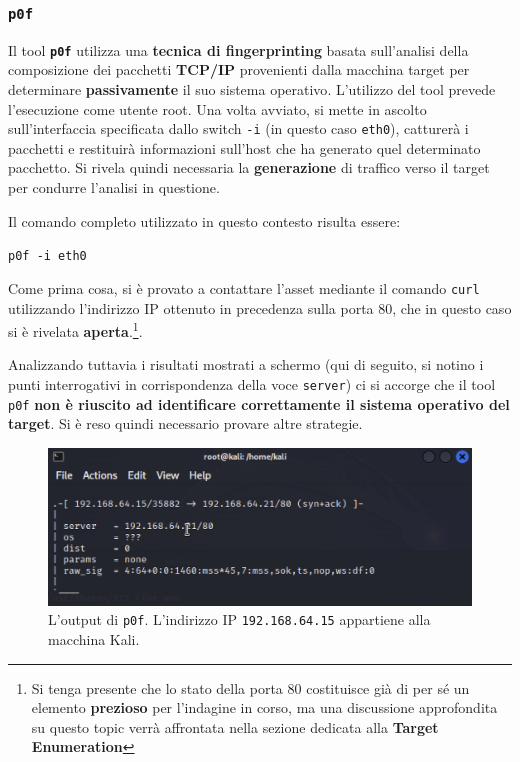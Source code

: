 \documentclass[a4paper, 12pt, oneside]{article}
\begin{document}
\subsubsection{\texttt{p0f}}
Il tool \textbf{\texttt{p0f}} utilizza una \textbf{tecnica di fingerprinting} basata sull'analisi della composizione dei pacchetti \textbf{TCP\slash IP} provenienti dalla macchina target per determinare \textbf{passivamente} il suo sistema operativo\cite{p0f}. L'utilizzo del tool prevede l'esecuzione come utente root. Una volta avviato, si mette in ascolto sull'interfaccia specificata dallo switch \texttt{-i} (in questo caso \texttt{eth0}), catturerà i pacchetti e restituirà informazioni sull'host che ha generato quel determinato pacchetto. Si rivela quindi necessaria la \textbf{generazione} di traffico verso il target per condurre l'analisi in questione. 

Il comando completo utilizzato in questo contesto risulta essere:

\begin{center}
    \texttt{p0f -i eth0}
\end{center}

Come prima cosa, si è provato a contattare l'asset mediante il comando \texttt{curl} utilizzando l'indirizzo IP ottenuto in precedenza sulla porta 80, che in questo caso si è rivelata \textbf{aperta}.\footnote{Si tenga presente che lo stato della porta 80 costituisce già di per sé un elemento \textbf{prezioso} per l'indagine in corso, ma una discussione approfondita su questo topic verrà affrontata nella sezione dedicata alla \textbf{Target Enumeration}}.


Analizzando tuttavia i risultati mostrati a schermo (qui di seguito, si notino i punti interrogativi in corrispondenza della voce \texttt{server}) ci si accorge che il tool \texttt{p0f} \textbf{non è riuscito ad identificare correttamente il sistema operativo del target}. Si è reso quindi necessario provare altre strategie.

\begin{figure}[h!]
    \centering
    \includegraphics[width=\textwidth]{img/p0f.png}
    \caption{L'output di \texttt{p0f}. L'indirizzo IP \texttt{192.168.64.15} appartiene alla macchina Kali.}
\end{figure}
\end{document}

